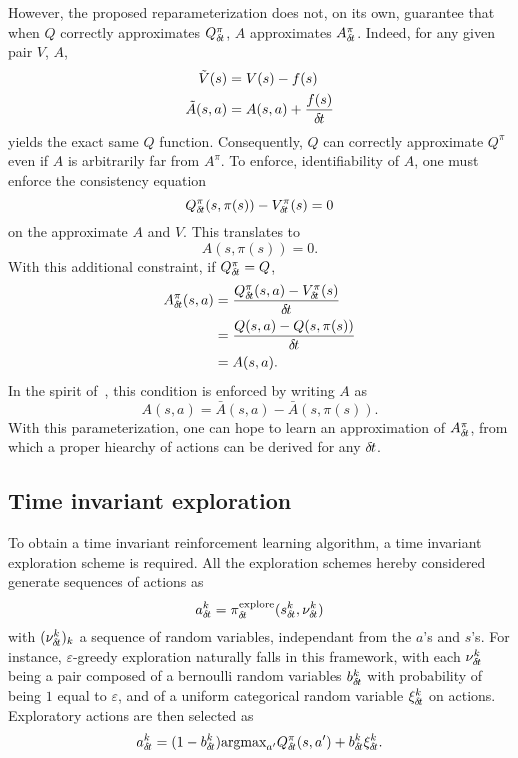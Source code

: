 However, the proposed reparameterization does not, on its own, guarantee that
when $Q$ correctly approximates $Q^\pi_{\delta\hspace{-.1em}t}$, $A$ approximates $A^\pi_{\delta\hspace{-.1em}t}$.
Indeed, for any given pair $V$, $A$,
\begin{align}
	\tilde{V}(s) &= V(s) - f(s)\\
	\tilde{A}(s, a) &= A(s, a) + \frac{f(s)}{{\delta\hspace{-.1em}t}}
\end{align}
yields the exact same $Q$ function. Consequently, $Q$ can correctly approximate
$Q^\pi$ even if $A$ is arbitrarily far from $A^\pi$.
To enforce, identifiability of $A$, one must enforce the consistency equation
\begin{equation}
	Q^\pi_{\delta\hspace{-.1em}t}(s, \pi(s)) - V^\pi_{\delta\hspace{-.1em}t}(s) = 0
\end{equation}
on the approximate $A$ and $V$. This translates to
\begin{equation}
	A(s, \pi(s)) = 0.
\end{equation}
With this additional constraint, if $Q^\pi_{\delta\hspace{-.1em}t} = Q$,
\begin{align}
	A^\pi_{\delta\hspace{-.1em}t}(s, a) &= \frac{Q^\pi_{\delta\hspace{-.1em}t}(s,a) - V^\pi_{\delta\hspace{-.1em}t}(s)}{{\delta\hspace{-.1em}t}}\\
		    &= \frac{Q(s,a) - Q(s, \pi(s))}{{\delta\hspace{-.1em}t}}\\
		    &= A(s, a).
\end{align}
In the spirit of~\cite{dueling_nets}, this condition is enforced by writing $A$ as
\begin{equation}
	A(s, a) = \bar{A}(s, a) - \bar{A}(s, \pi(s)).
\end{equation}
With this parameterization, one can hope to learn an approximation of $A^\pi_{\delta\hspace{-.1em}t}$,
from which a proper hiearchy of actions can be derived for any ${\delta\hspace{-.1em}t}$.

\subsection{Time invariant exploration}
\label{subsec:explo}
To obtain a time invariant reinforcement learning algorithm, a time invariant
exploration scheme is required. All the exploration schemes hereby considered
generate sequences of actions as
\begin{equation}
	a^k_{\delta\hspace{-.1em}t} = \pi^\text{explore}_{\delta\hspace{-.1em}t}(s^k_{\delta\hspace{-.1em}t}, \nu^k_{\delta\hspace{-.1em}t})
\end{equation}
with $(\nu^k_{\delta\hspace{-.1em}t})_k$ a sequence of random variables, independant from the $a$'s and $s$'s.
For instance, $\varepsilon$-greedy exploration naturally falls in this framework, with each $\nu^k_{\delta\hspace{-.1em}t}$
being a pair composed of a bernoulli random variables $b^k_{\delta\hspace{-.1em}t}$ with probability of being $1$ equal to $\varepsilon$,
and of a uniform categorical random variable $\xi^k_{\delta\hspace{-.1em}t}$ on actions. Exploratory actions are then selected as
\begin{equation}
	a^k_{\delta\hspace{-.1em}t} = (1 - b^k_{\delta\hspace{-.1em}t}) \text{argmax}_{a'} Q^\pi_{\delta\hspace{-.1em}t}(s, a') + b^k_{\delta\hspace{-.1em}t} \xi^k_{\delta\hspace{-.1em}t}.
\end{equation}


